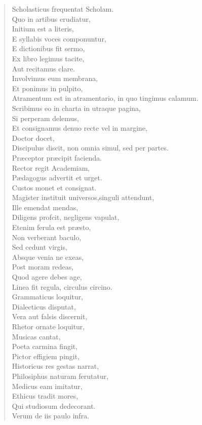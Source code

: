 \begin{verse}

  Scholasticus frequentat Scholam.\\
  Quo in artibus erudiatur,\\
  Initium est a literis,\\
  E syllabis voces componuntur,\\
  E dictionibus fit sermo,\\
  Ex libro legimus tacite,\\
  Aut recitamus clare.\\
  Involvimus eum membrana,\\
  Et ponimus in pulpito,\\
  Atramentum est in atramentario, in quo tingimus calamum.\\
  Scribimus eo in charta in utraque pagina,\\
  Si perperam delemus,\\
  Et consignamus denuo recte vel in margine,\\
  Doctor docet,\\
  Discipulus discit, non omnia simul, sed per partes.\\
  Præceptor præcipit facienda.\\
  Rector regit Academiam,\\
  Pædagogus advertit et urget.\\
  Custos monet et consignat.\\
  Magister instituit universos,singuli attendunt,\\
  Ille emendat mendas,\\
  Diligens profcit, negligens vapulat,\\
  Etenim ferula est præsto,\\
  Non verberant baculo,\\
  Sed cedunt virgis,\\
  Absque venia ne exeas,\\
  Post moram redeas,\\
  Quod agere debes age,\\
  Linea fit regula, circulus circino.\\
  Grammaticus loquitur,\\
  Dialecticus disputat,\\
  Vera aut falsis discernit,\\
  Rhetor ornate loquitur,\\
  Musicas cantat,\\
  Poeta carmina fingit,\\
  Pictor effigiem pingit,\\
  Historicus res gestas narrat,\\
  Philosiphus naturam ferutatur,\\
  Medicus eam imitatur,\\
  Ethicus tradit mores,\\
  Qui studiosum dedecorant.\\
  Verum de iis paulo infra.\\
\end{verse}




